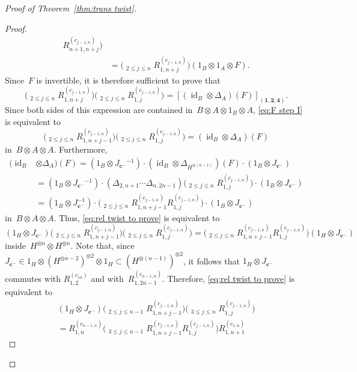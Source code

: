 \documentclass[12pt, reqno]{amsart}
\theoremstyle{definition}
\newcommand{\dscprod}{\mathop{\overleftarrow{\prod}}}
\numberwithin{equation}{section}
\newcommand{\tensor}{\otimes}
\DeclareMathOperator{\id}{id}
\begin{document}
\begin{proof}[Proof of Theorem~\ref{thm:trans twist}]
\begin{proof}
\begin{align}
R_{n+1,n+j}^{(c_{j-1,n})}\Big)
\nonumber\\
&=\Big(\dscprod_{2\le j\le n}
R_{1,n+j}^{(c_{j-1,n})}\Big)(1_B\tensor 1_A\tensor F).
\label{eq:F13,4}
\end{align}
Since~$F$ is invertible, it is therefore sufficient to prove that 
\begin{equation}\label{eq:F step I}
\Big(\dscprod_{2\le j\le n}
R_{1,n+j}^{(c_{j-1,n})}\Big)\Big(\dscprod_{2\le j\le n}
R_{1,j}^{(c_{j-1,n})}\Big)=[(\id_B\tensor \Delta_A)(F)]_{(\mathbf 1,\mathbf 2,\mathbf 4)}.
\end{equation}
Since both sides of this expression are contained in~$B\tensor A\tensor 1_B\tensor A$, \eqref{eq:F step I} is equivalent to
$$
\Big(\dscprod_{2\le j\le n}
R_{1,n+j-1}^{(c_{j-1,n})}\Big)\Big(\dscprod_{2\le j\le n}
R_{1,j}^{(c_{j-1,n})}\Big)=(\id_B\tensor \Delta_A)(F)
$$
in~$B\tensor A\tensor A$.
Furthermore, 
\begin{align*}
(\id_B&\tensor \Delta_A)(F)
=(1_B\tensor J_{\mathbf c^-}{}^{-1})\cdot (\id_B\tensor \Delta_{H^{\tensor(n-1)}})(F)\cdot(1_B\tensor J_{\mathbf c^-})\\
&=(1_B\tensor J_{\mathbf c^-}{}^{-1})\cdot (\Delta_{2,n+1}\cdots\Delta_{n,2n-1})\Big(\dscprod_{2\le j\le n}
R_{1,j}^{(c_{j-1,n})}
\Big)
\cdot(1_B\tensor J_{\mathbf c^-})\\
&=(1_B\tensor J_{\mathbf c^-}^{-1})\cdot \Big(\dscprod_{2\le j\le n}
R_{1,n+j-1}^{(c_{j-1,n})}R_{1,j}^{(c_{j-1,n})}
\Big)
\cdot(1_B\tensor J_{\mathbf c^-})
\end{align*}
in~$B\tensor A\tensor A$.
Thus, \eqref{eq:rel twist to prove} is equivalent to
$$
(1_H\tensor J_{\mathbf c^-})\Big(\dscprod_{2\le j\le n}
R_{1,n+j-1}^{(c_{j-1,n})}\Big)\Big(\dscprod_{2\le j\le n}
R_{1,j}^{(c_{j-1,n})}\Big)=\Big(\dscprod_{2\le j\le n}
R_{1,n+j-1}^{(c_{j-1,n})}R_{1,j}^{(c_{j-1,n})}
\Big)(1_H\tensor J_{\mathbf c^-})
$$
inside~$H^{\tensor n}\tensor H^{\tensor n}$. Note that,
since~$J_{\mathbf c^-}\in 1_H\tensor (H^{\tensor n-2})^{\tensor 2}\tensor 1_H\subset 
(H^{\tensor (n-1)})^{\tensor 2}$, it follows that $1_H\tensor J_{\mathbf c^-}$
commutes with $R_{1,2}^{(c_{1n})}$ and 
with~$R_{1,2n-1}^{(c_{n-1,n})}$. Therefore,
\eqref{eq:rel twist to prove} is equivalent to
\begin{multline*}
(1_H\tensor J_{\mathbf c^-})\Big(\dscprod_{2\le j\le n-1}
R_{1,n+j-1}^{(c_{j-1,n})}\Big)\Big(\dscprod_{3\le j\le n}
R_{1,j}^{(c_{j-1,n})}\Big)\\
=R_{1,n}^{(c_{n-1,n})}\Big(\dscprod_{3\le j\le n-1}
R_{1,n+j-1}^{(c_{j-1,n})}R_{1,j}^{(c_{j-1,n})}\Big)R_{1,n+1}^{(c_{1,n})}

\end{multline*}
\end{proof}
\end{proof}
\end{document}
